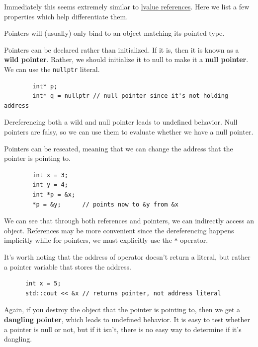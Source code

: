 \documentclass{article}
\begin{document}
    Immediately this seems extremely similar to \hyperref[def:lvalue-reference]{lvalue references}. Here we list a few properties which help differentiate them. 

    \begin{lemma}[Typechecking]
      \label{thm:typechecking-2}
      Pointers will (usually) only bind to an object matching its pointed type. 
    \end{lemma}

    \begin{lemma}
      \label{thm:declaration-is-okay}
      Pointers can be declared rather than initialized. If it is, then it is known as a \textbf{wild pointer}. Rather, we should initialize it to null to make it a \textbf{null pointer}. We can use the \texttt{nullptr} literal. 
      \begin{lstlisting}
        int* p; 
        int* q = nullptr // null pointer since it's not holding address
      \end{lstlisting}
      Dereferencing both a wild and null pointer leads to undefined behavior. Null pointers are falsy, so we can use them to evaluate whether we have a null pointer. 
    \end{lemma}

    \begin{lemma}
      \label{thm:reseating-allowed}
      Pointers can be reseated, meaning that we can change the address that the pointer is pointing to. 
      \begin{lstlisting}
        int x = 3; 
        int y = 4; 
        int *p = &x; 
        *p = &y;      // points now to &y from &x
      \end{lstlisting}
    \end{lemma} 

    We can see that through both references and pointers, we can indirectly access an object. References may be more convenient since the dereferencing happens implicitly while for pointers, we must explicitly use the \texttt{*} operator. 

    It's worth noting that the address of operator doesn't return a literal, but rather a pointer variable that stores the address. 
    \begin{lstlisting}
      int x = 5; 
      std::cout << &x // returns pointer, not address literal
    \end{lstlisting}

    Again, if you destroy the object that the pointer is pointing to, then we get a \textbf{dangling pointer}, which leads to undefined behavior. It is easy to test whether a pointer is null or not, but if it isn't, there is no easy way to determine if it's dangling. 
\end{document}
